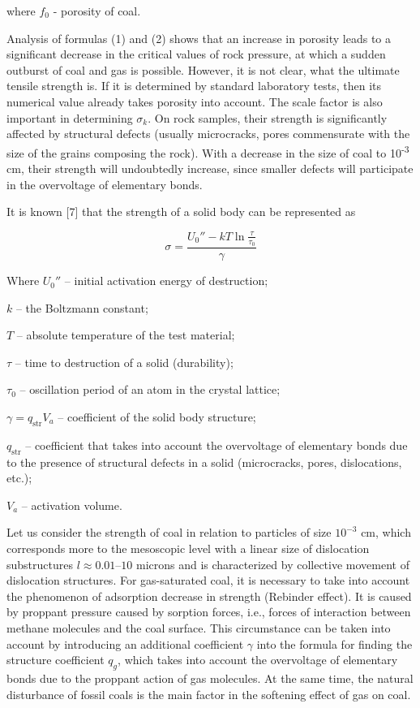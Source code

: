 \begin{multicols}{2}
where $f_0$ - porosity of coal.

Analysis of formulas (1) and (2) shows that an increase in porosity
leads to a significant decrease in the critical values of rock pressure,
at which a sudden outburst of coal and gas is possible. However, it is
not clear, what the ultimate tensile strength is. If it is determined by
standard laboratory tests, then its numerical value already takes
porosity into account. The scale factor is also important in
determining $\sigma_k$. On rock samples, their strength is
significantly affected by structural defects (usually microcracks, pores
commensurate with the size of the grains composing the rock). With a
decrease in the size of coal to 10\textsuperscript{-3} cm, their
strength will undoubtedly increase, since smaller defects will
participate in the overvoltage of elementary bonds.

It is known {[}7{]} that the strength of a solid body can be represented
as

\begin{equation}
\sigma = \frac{U_0'' - \mathit{kT} \ln \frac{\tau}{\tau_0}}{\gamma}
\end{equation}

Where $U_0''$ -- initial activation energy of destruction;  

$k$ -- the Boltzmann constant;  

$T$ -- absolute temperature of the test material;  

$\tau$ -- time to destruction of a solid (durability);  

$\tau_0$ -- oscillation period of an atom in the crystal lattice;  

$\gamma = q_{\mathrm{str}} V_a$ -- coefficient of the solid body structure;  

$q_{\mathrm{str}}$ -- coefficient that takes into account the overvoltage of elementary bonds due to the presence of structural defects in a solid (microcracks, pores, dislocations, etc.);  

$V_a$ -- activation volume.

Let us consider the strength of coal in relation to particles of size
$10^{-3}$ cm, which corresponds more to the mesoscopic level with a
linear size of dislocation substructures $l \approx 0.01$–$10$ microns
and is characterized by collective movement of dislocation
structures. For gas-saturated coal, it is necessary to take into
account the phenomenon of adsorption decrease in strength (Rebinder
effect). It is caused by proppant pressure caused by sorption forces,
i.e., forces of interaction between methane molecules and the coal
surface. This circumstance can be taken into account by introducing an
additional coefficient $\gamma$ into the formula for finding the
structure coefficient $q_g$, which takes into account the overvoltage
of elementary bonds due to the proppant action of gas molecules. At
the same time, the natural disturbance of fossil coals is the main
factor in the softening effect of gas on coal.


\end{multicols}
